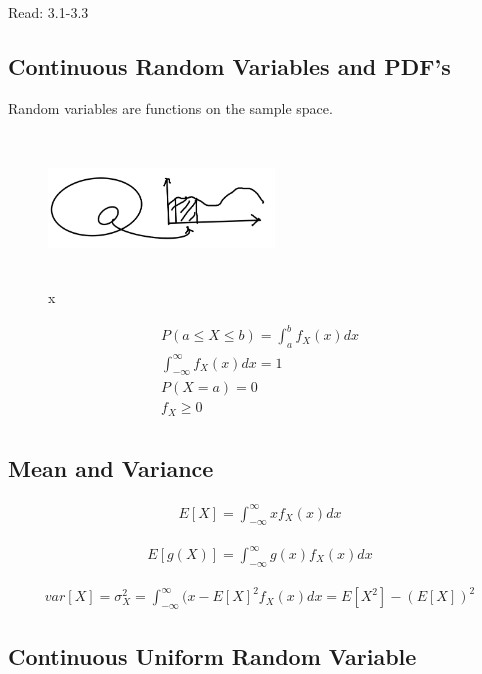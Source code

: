 

Read: 3.1-3.3

\subsection{Continuous Random Variables and PDF's}

Random variables are functions on the sample space.

\begin{figure}[!ht]
\centering
\includegraphics[width=6cm, height=4cm]{images/L08/continuous_rv.jpeg}
\caption{x}
\end{figure}

\begin{align*}
P(a \le X \le b) = \int_a^b f_X(x)dx \\
\int_{-\infty}^\infty f_X(x)dx=1 \\
P(X=a)=0 \\
f_X \ge 0\\
\end{align*}

\subsection{Mean and Variance}


\begin{align*}
E[X] = \int_{-\infty}^{\infty} x f_X(x)dx
\end{align*}

\begin{align*}
E[g(X)] = \int_{-\infty}^{\infty} g(x) f_X(x)dx
\end{align*}

\begin{align*}
var[X] = \sigma_X^2 = \int_{-\infty}^{\infty} (x - E[X]^2 f_X(x)dx = E[X^2] - (E[X])^2
\end{align*}

\subsection{Continuous Uniform Random Variable}

